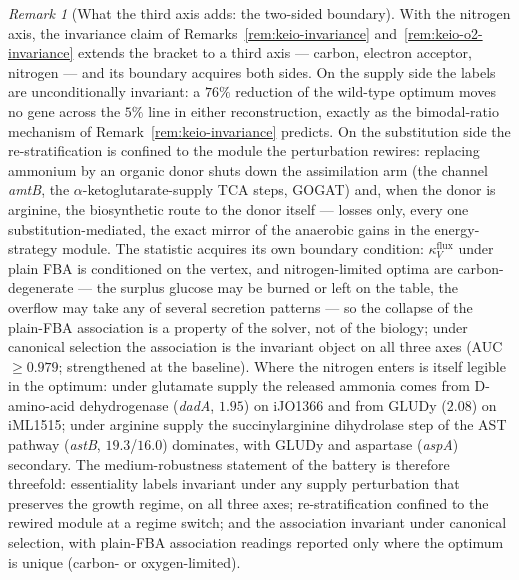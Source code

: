 \documentclass[11pt,a4paper]{article}
\theoremstyle{plain}
\theoremstyle{definition}
\theoremstyle{remark}
\newtheorem{remark}[theorem]{Remark}
\begin{document}
\begin{remark}[What the third axis adds: the two-sided boundary]
\label{rem:keio-n-invariance}
With the nitrogen axis, the invariance claim of
Remarks~\ref{rem:keio-invariance} and~\ref{rem:keio-o2-invariance}
extends the bracket to a third axis --- carbon, electron acceptor,
nitrogen --- and its boundary acquires both sides. On the supply
side the labels are unconditionally invariant: a $76\%$ reduction
of the wild-type optimum moves no gene across the $5\%$ line in
either reconstruction, exactly as the bimodal-ratio mechanism of
Remark~\ref{rem:keio-invariance} predicts. On the substitution
side the re-stratification is confined to the module the
perturbation rewires: replacing ammonium by an organic donor shuts
down the assimilation arm (the channel \emph{amtB}, the
$\alpha$-ketoglutarate-supply TCA steps, GOGAT) and, when the donor
is arginine, the biosynthetic route to the donor itself --- losses
only, every one substitution-mediated, the exact mirror of the
anaerobic gains in the energy-strategy module. The statistic
acquires its own boundary condition:
$\kappa^{\mathrm{flux}}_V$ under plain FBA is conditioned on the
vertex, and nitrogen-limited optima are carbon-degenerate --- the
surplus glucose may be burned or left on the table, the overflow
may take any of several secretion patterns --- so the collapse of
the plain-FBA association is a property of the solver, not of the
biology; under canonical selection the association is the invariant
object on all three axes (AUC $\ge 0.979$; strengthened at the
baseline). Where the nitrogen enters is itself legible in the
optimum: under glutamate supply the released ammonia comes from
D-amino-acid dehydrogenase (\emph{dadA}, $1.95$) on iJO1366 and
from GLUDy ($2.08$) on iML1515; under arginine supply the
succinylarginine dihydrolase step of the AST pathway (\emph{astB},
$19.3$/$16.0$) dominates, with GLUDy and aspartase (\emph{aspA})
secondary. The medium-robustness statement of the battery is
therefore threefold: essentiality labels invariant under any supply
perturbation that preserves the growth regime, on all three axes;
re-stratification confined to the rewired module at a regime
switch; and the association invariant under canonical selection,
with plain-FBA association readings reported only where the optimum
is unique (carbon- or oxygen-limited).
\end{remark}
\end{document}

